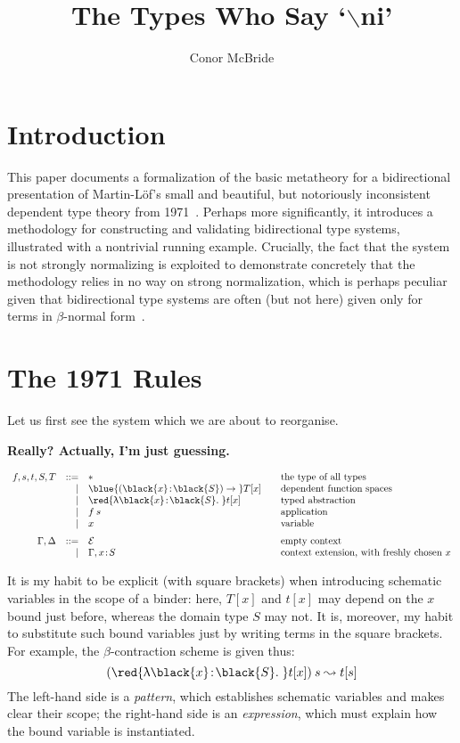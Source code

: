\documentclass[natbib]{article}
\newcommand{\type}{\ast}
\newcommand{\hb}{\!:\!}
\newcommand{\PI}[2]{\blue{(\black{#1}\hb \black{#2})\to\;}}
\newcommand{\LT}[2]{\red{\uplambda\black{#1}\hb \black{#2}.\;}}
\newcommand{\EC}{\mathcal{E}}
\begin{document}
\title{The Types Who Say `$\backslash$ni'}
\author{Conor McBride}
\maketitle

\section{Introduction}

This paper documents a formalization of the basic metatheory for a bidirectional presentation of Martin-L\"of's small and beautiful, but notoriously inconsistent dependent type theory from 1971~\cite{martinloef:atheoryoftypes}. Perhaps more significantly, it introduces a methodology for constructing and validating bidirectional type systems, illustrated with a nontrivial running example. Crucially, the fact that the system is not strongly normalizing is exploited to demonstrate concretely that the methodology relies in no way on strong normalization, which is perhaps peculiar given that bidirectional type systems are often (but not here) given only for terms in $\beta$-normal form~\cite{DBLP:journals/toplas/PierceT00}.


\section{The 1971 Rules}

Let us first see the system which we are about to reorganise.

\textbf{Really? Actually, I'm just guessing.}

\[\begin{array}{rrl@{\qquad}l}
f,s,t,S,T & ::= & \type & \mbox{the type of all types} \\
          &   | & \PI xS T[x] & \mbox{dependent function spaces} \\
          &   | & \LT xS t[x] & \mbox{typed abstraction} \\
          &   | & f\:s        & \mbox{application} \\
          &   | & x           & \mbox{variable} \medskip\\
\Gamma,\Delta & ::= & \EC & \mbox{empty context} \\
              &   | & \Gamma,x\hb S & \mbox{context extension, with freshly chosen $x$}
\end{array}\]

It is my habit to be explicit (with square brackets) when introducing schematic variables in the scope of a binder: here, $T[x]$ and $t[x]$ may depend on the $x$ bound just before, whereas the domain type $S$ may not. It is, moreover, my habit to substitute such bound variables just by writing terms in the square brackets. For example, the $\beta$-contraction scheme is given thus:
\[
(\LT xS t[x])\:s \leadsto t[s]
\]
The left-hand side is a \emph{pattern}, which establishes schematic variables and makes clear their scope;
the right-hand side is an \emph{expression}, which must explain how the bound variable is instantiated.
\end{document}

